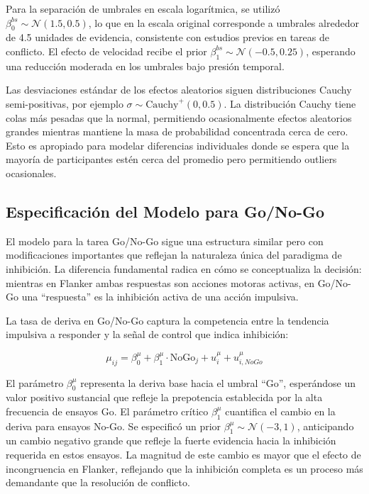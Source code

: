 \documentclass[
  spanish,
  10pt,
]{article}
\begin{document}
Para la separación de umbrales en escala logarítmica, se utilizó
\(\beta_0^{bs} \sim \mathcal{N}(1.5, 0.5)\), lo que en la escala
original corresponde a umbrales alrededor de 4.5 unidades de evidencia,
consistente con estudios previos en tareas de conflicto. El efecto de
velocidad recibe el prior \(\beta_1^{bs} \sim \mathcal{N}(-0.5, 0.25)\),
esperando una reducción moderada en los umbrales bajo presión temporal.

Las desviaciones estándar de los efectos aleatorios siguen
distribuciones Cauchy semi-positivas, por ejemplo
\(\sigma \sim \text{Cauchy}^+(0, 0.5)\). La distribución Cauchy tiene
colas más pesadas que la normal, permitiendo ocasionalmente efectos
aleatorios grandes mientras mantiene la masa de probabilidad concentrada
cerca de cero. Esto es apropiado para modelar diferencias individuales
donde se espera que la mayoría de participantes estén cerca del promedio
pero permitiendo outliers ocasionales.

\subsection{Especificación del Modelo para
Go/No-Go}\label{especificaciuxf3n-del-modelo-para-gono-go}

El modelo para la tarea Go/No-Go sigue una estructura similar pero con
modificaciones importantes que reflejan la naturaleza única del
paradigma de inhibición. La diferencia fundamental radica en cómo se
conceptualiza la decisión: mientras en Flanker ambas respuestas son
acciones motoras activas, en Go/No-Go una ``respuesta'' es la inhibición
activa de una acción impulsiva.

La tasa de deriva en Go/No-Go captura la competencia entre la tendencia
impulsiva a responder y la señal de control que indica inhibición:

\[\mu_{ij} = \beta_0^{\mu} + \beta_1^{\mu} \cdot \text{NoGo}_{j} + u_i^{\mu} + u_{i,NoGo}^{\mu}\]

El parámetro \(\beta_0^{\mu}\) representa la deriva base hacia el umbral
``Go'', esperándose un valor positivo sustancial que refleje la
prepotencia establecida por la alta frecuencia de ensayos Go. El
parámetro crítico \(\beta_1^{\mu}\) cuantifica el cambio en la deriva
para ensayos No-Go. Se especificó un prior
\(\beta_1^{\mu} \sim \mathcal{N}(-3, 1)\), anticipando un cambio
negativo grande que refleje la fuerte evidencia hacia la inhibición
requerida en estos ensayos. La magnitud de este cambio es mayor que el
efecto de incongruencia en Flanker, reflejando que la inhibición
completa es un proceso más demandante que la resolución de conflicto.
\end{document}
